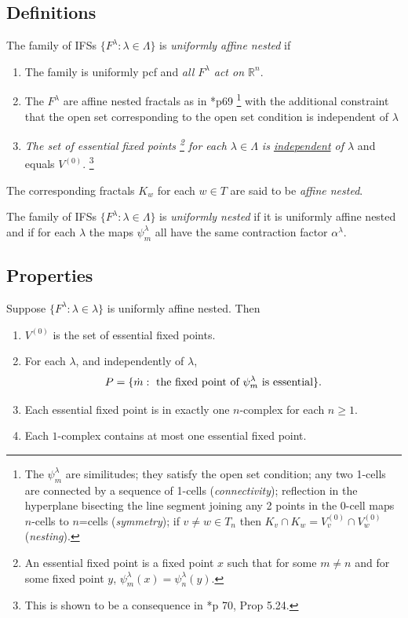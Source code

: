 \documentclass[a4paper]{amsart}
\theoremstyle{plain}
\theoremstyle{definition}
\theoremstyle{remark}
\begin{document}
\subsection{Definitions}
The family of IFSs $ \{F^ \lambda  : \lambda \in \Lambda\} $ is \emph{uniformly affine nested} if
\begin{enumerate}

\item The   family is uniformly  pcf
and   \emph{all $ F^\lambda $ act on $ \mathbb{R}^n $}.

\item The $ F^\lambda $ are affine nested fractals as in \cite{Bar}*{p69}%
\footnote{The $ \psi^\lambda  _m $ are similitudes; they satisfy the open set condition; any two 1-cells are connected by a sequence of 1-cells (\emph{connectivity}); reflection in the hyperplane bisecting the line segment joining any 2 points in the 0-cell maps $ n $-cells to $ n$=cells (\emph{symmetry});
if $ v\neq w \in T_n $ then $ K_v \cap K_w = V_v^{(0)} \cap V_w^{(0)}$ (\emph{nesting}).} 
with the additional constraint that the open set corresponding to the open set condition is independent of $ \lambda $ 

\item  \emph{The set   of essential fixed points%
\footnote{An essential fixed point is a fixed  point $ x $ such that for some $ m \neq n $ and for some fixed point $ y $,   $ \psi_m^ \lambda (x) =  \psi_n^ \lambda (y) $.} 
for each $ \lambda \in \Lambda $ is \underline{independent} of $ \lambda $} and equals $ V^{(0)}  $.%
\footnote{This is shown to be a consequence in \cite{Bar}*{p 70, Prop 5.24}.}
 \end{enumerate}
 The corresponding fractals $ K_w $ for each $ w \in T $ are said to be \emph{affine nested}.

\bigskip  The family of IFSs $ \{F^ \lambda  : \lambda \in \Lambda\} $ is \emph{uniformly nested} if
it is uniformly affine nested and if for each $ \lambda $ the maps $ \psi^\lambda _m $ all have the same contraction factor $ \alpha^ \lambda  $.
 
 

\subsection{Properties} Suppose $ \{ F^ \lambda : \lambda \in \lambda \}  $ is uniformly affine nested.  Then
\begin{enumerate}
\item $ V^{(0)} $ is the set of essential fixed points.
\item
For each $ \lambda $,  and independently of $  \lambda $, 
\[
    P =  \{ \dot{m} : \text{ the fixed point of $  \psi^ \lambda _m $  is essential} \} .
    \] 
    
    \item Each essential fixed point is in exactly one $ n $-complex for each $ n \geq 1 $.
    
    \item Each $ 1 $-complex contains at most one essential fixed point.
\end{enumerate} 
\end{document}
